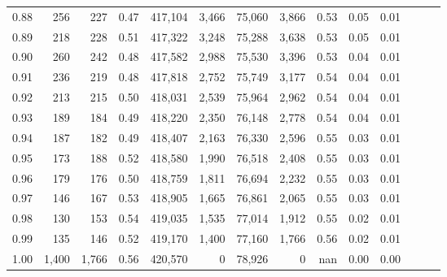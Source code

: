 \begin{tabular}{rrrrrrrrrrrrrr}
0.88 &     256 &    227 &  0.47 &  417,104 &    3,466 &  75,060 &   3,866 &  0.53 &  0.05 &      0.01 \\
0.89 &     218 &    228 &  0.51 &  417,322 &    3,248 &  75,288 &   3,638 &  0.53 &  0.05 &      0.01 \\
0.90 &     260 &    242 &  0.48 &  417,582 &    2,988 &  75,530 &   3,396 &  0.53 &  0.04 &      0.01 \\
0.91 &     236 &    219 &  0.48 &  417,818 &    2,752 &  75,749 &   3,177 &  0.54 &  0.04 &      0.01 \\
0.92 &     213 &    215 &  0.50 &  418,031 &    2,539 &  75,964 &   2,962 &  0.54 &  0.04 &      0.01 \\
0.93 &     189 &    184 &  0.49 &  418,220 &    2,350 &  76,148 &   2,778 &  0.54 &  0.04 &      0.01 \\
0.94 &     187 &    182 &  0.49 &  418,407 &    2,163 &  76,330 &   2,596 &  0.55 &  0.03 &      0.01 \\
0.95 &     173 &    188 &  0.52 &  418,580 &    1,990 &  76,518 &   2,408 &  0.55 &  0.03 &      0.01 \\
0.96 &     179 &    176 &  0.50 &  418,759 &    1,811 &  76,694 &   2,232 &  0.55 &  0.03 &      0.01 \\
0.97 &     146 &    167 &  0.53 &  418,905 &    1,665 &  76,861 &   2,065 &  0.55 &  0.03 &      0.01 \\
0.98 &     130 &    153 &  0.54 &  419,035 &    1,535 &  77,014 &   1,912 &  0.55 &  0.02 &      0.01 \\
0.99 &     135 &    146 &  0.52 &  419,170 &    1,400 &  77,160 &   1,766 &  0.56 &  0.02 &      0.01 \\
1.00 &   1,400 &  1,766 &  0.56 &  420,570 &        0 &  78,926 &       0 &   nan &  0.00 &      0.00 \\
\bottomrule
\end{tabular}
